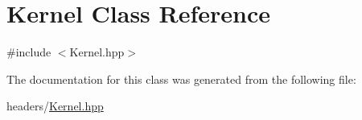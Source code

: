 \hypertarget{class_kernel}{}\section{Kernel Class Reference}
\label{class_kernel}


{\ttfamily \#include $<$Kernel.\+hpp$>$}



The documentation for this class was generated from the following file\+:\begin{DoxyCompactItemize}
\item 
headers/\mbox{\hyperlink{_kernel_8hpp}{Kernel.\+hpp}}\end{DoxyCompactItemize}
